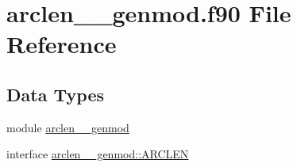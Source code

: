 \hypertarget{arclen____genmod_8f90}{\section{arclen\+\_\+\+\_\+genmod.\+f90 File Reference}
\label{arclen____genmod_8f90}
}
\subsection*{Data Types}
\begin{DoxyCompactItemize}
\item 
module \hyperlink{classarclen____genmod}{arclen\+\_\+\+\_\+genmod}
\item 
interface \hyperlink{interfacearclen____genmod_1_1ARCLEN}{arclen\+\_\+\+\_\+genmod\+::\+A\+R\+C\+L\+E\+N}
\end{DoxyCompactItemize}
